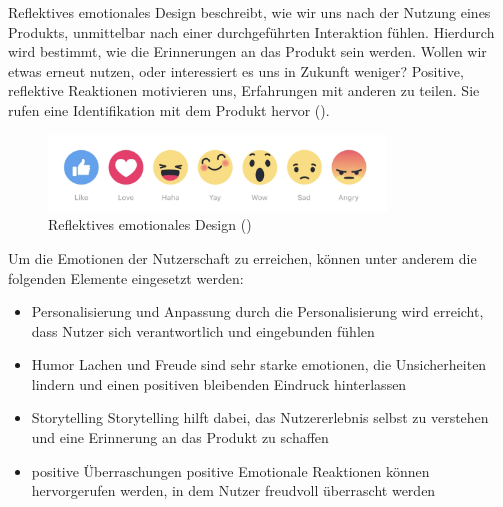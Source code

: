 \documentclass[./dokumentation.tex]{subfiles}
\begin{document}
Reflektives emotionales Design beschreibt, wie wir uns nach der Nutzung eines Produkts, unmittelbar nach einer durchgeführten Interaktion fühlen. Hierdurch wird bestimmt, wie die Erinnerungen an das Produkt sein werden. Wollen wir etwas erneut nutzen, oder interessiert es uns in Zukunft weniger? Positive, reflektive Reaktionen motivieren uns, Erfahrungen mit anderen zu teilen. Sie rufen eine Identifikation mit dem Produkt hervor (\cite{medium_muz}).\\

\begin{figure}
    \centering
    \includegraphics[width=0.8\textwidth]{bilder/refl-design.png}
    \caption{Reflektives emotionales Design (\cite{medium_muz})}
    \label{fig3:refl}
\end{figure}\pagebreak

Um die Emotionen der Nutzerschaft zu erreichen, können unter anderem die folgenden Elemente eingesetzt werden: 
\begin{itemize}
    \item Personalisierung und Anpassung
    \subitem{} durch die Personalisierung wird erreicht, dass Nutzer sich verantwortlich und eingebunden fühlen
    \item Humor
    \subitem{} Lachen und Freude sind sehr starke emotionen, die Unsicherheiten lindern und einen positiven bleibenden Eindruck hinterlassen
    \item Storytelling
    \subitem{} Storytelling hilft dabei, das Nutzererlebnis selbst zu verstehen und eine Erinnerung an das Produkt zu schaffen
    \item positive Überraschungen
    \subitem{} positive Emotionale Reaktionen können hervorgerufen werden, in dem Nutzer freudvoll überrascht werden
\end{itemize}

\end{document}
